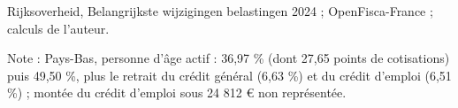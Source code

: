 Rijksoverheid, Belangrijkste wijzigingen belastingen 2024 ; OpenFisca-France ; calculs de l'auteur.\par Note : Pays-Bas, personne d'âge actif : 36,97 \% (dont 27,65 points de cotisations) puis 49,50 \%, plus le retrait du crédit général (6,63 \%) et du crédit d'emploi (6,51 \%) ; montée du crédit d'emploi sous 24 812 \euro{} non représentée.

